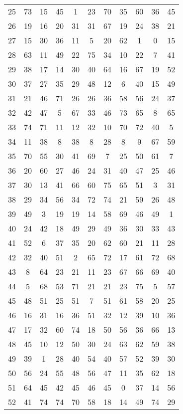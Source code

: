 \begin{table}
\begin{tabular}{c c c c c c c c c c c }
25 & 73 & 15 & 45 & 1 & 23 & 70 & 35 & 60 & 36 & 45 \\
26 & 19 & 16 & 20 & 31 & 31 & 67 & 19 & 24 & 38 & 21 \\
27 & 15 & 30 & 36 & 11 & 5 & 20 & 62 & 1 & 0 & 15 \\
28 & 63 & 11 & 49 & 22 & 75 & 34 & 10 & 22 & 7 & 41 \\
29 & 38 & 17 & 14 & 30 & 40 & 64 & 16 & 67 & 19 & 52 \\
30 & 37 & 27 & 35 & 29 & 48 & 12 & 6 & 40 & 15 & 49 \\
31 & 21 & 46 & 71 & 26 & 26 & 36 & 58 & 56 & 24 & 37 \\
32 & 42 & 47 & 5 & 67 & 33 & 46 & 73 & 65 & 8 & 65 \\
33 & 74 & 71 & 11 & 12 & 32 & 10 & 70 & 72 & 40 & 5 \\
34 & 11 & 38 & 8 & 38 & 8 & 28 & 8 & 9 & 67 & 59 \\
35 & 70 & 55 & 30 & 41 & 69 & 7 & 25 & 50 & 61 & 7 \\
36 & 20 & 60 & 27 & 46 & 24 & 31 & 40 & 47 & 25 & 46 \\
37 & 30 & 13 & 41 & 66 & 60 & 75 & 65 & 51 & 3 & 31 \\
38 & 29 & 34 & 56 & 34 & 72 & 74 & 21 & 59 & 26 & 48 \\
39 & 49 & 3 & 19 & 19 & 14 & 58 & 69 & 46 & 49 & 1 \\
40 & 24 & 42 & 18 & 49 & 29 & 49 & 36 & 30 & 33 & 43 \\
41 & 52 & 6 & 37 & 35 & 20 & 62 & 60 & 21 & 11 & 28 \\
42 & 32 & 40 & 51 & 2 & 65 & 72 & 17 & 61 & 72 & 68 \\
43 & 8 & 64 & 23 & 21 & 11 & 23 & 67 & 66 & 69 & 40 \\
44 & 5 & 68 & 53 & 71 & 21 & 21 & 23 & 75 & 5 & 57 \\
45 & 48 & 51 & 25 & 51 & 7 & 51 & 61 & 58 & 20 & 25 \\
46 & 16 & 31 & 16 & 36 & 51 & 32 & 12 & 39 & 10 & 36 \\
47 & 17 & 32 & 60 & 74 & 18 & 50 & 56 & 36 & 66 & 13 \\
48 & 45 & 10 & 12 & 50 & 30 & 24 & 63 & 62 & 59 & 38 \\
49 & 39 & 1 & 28 & 40 & 54 & 40 & 57 & 52 & 39 & 30 \\
50 & 56 & 24 & 55 & 48 & 56 & 47 & 11 & 35 & 62 & 18 \\
51 & 64 & 45 & 42 & 45 & 46 & 45 & 0 & 37 & 14 & 56 \\
52 & 41 & 74 & 74 & 70 & 58 & 18 & 14 & 49 & 74 & 29 \\

\end{tabular}
\end{table}
